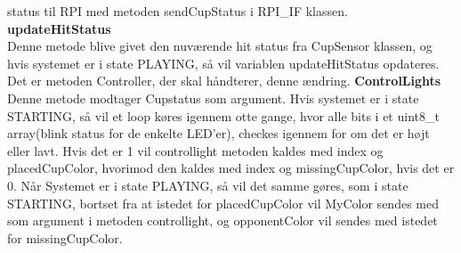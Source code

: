 \documentclass[Softwaredesign/Softwaredesign_main.tex]{subfiles}
\begin{document}
status til RPI med metoden sendCupStatus i RPI\_IF klassen. 
\textbf{updateHitStatus}\\
Denne metode blive givet den nuværende hit status fra CupSensor klassen, og hvis systemet er i state PLAYING, så vil variablen updateHitStatus opdateres. Det er metoden Controller, der skal håndterer, denne ændring.
\textbf{ControlLights}\\
Denne metode modtager Cupstatus som argument. Hvis systemet er i state STARTING, så vil et loop køres igennem otte gange, hvor alle bits i et uint8\_t array(blink status for de enkelte LED'er), checkes igennem for om det er højt eller lavt. Hvis det er 1 vil controllight metoden kaldes med index og placedCupColor, hvorimod den kaldes med index og missingCupColor, hvis det er 0. Når Systemet er i state PLAYING, så vil det samme gøres, som i state STARTING, bortset fra at istedet for placedCupColor vil MyColor sendes med som argument i metoden controllight, og opponentColor vil sendes med istedet for missingCupColor.
\end{document}
